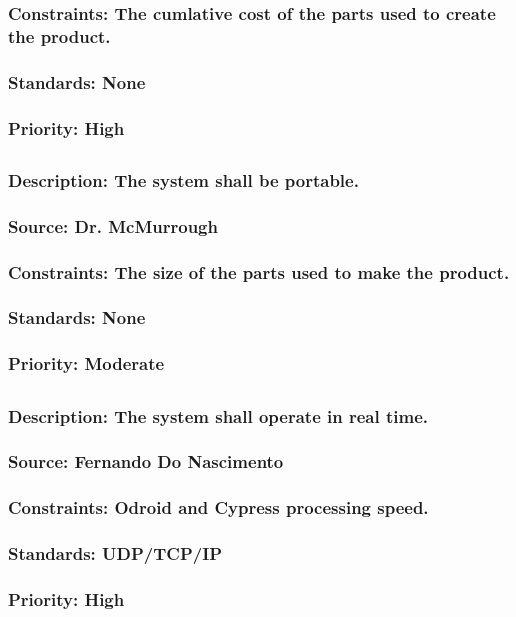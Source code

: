\subsubsection{Constraints: The cumlative cost of the parts used to create the product.}
\subsubsection{Standards: None}
\subsubsection{Priority: High}

\subsection{\bfPortability}
\subsubsection{Description: The system shall be portable.}
\subsubsection{Source: Dr. McMurrough}
\subsubsection{Constraints: The size of the parts used to make the product.}
\subsubsection{Standards: None}
\subsubsection{Priority: Moderate}

\subsection{\bfPerception}
\subsubsection{Description: The system shall operate in real time.}
\subsubsection{Source: Fernando Do Nascimento}
\subsubsection{Constraints: Odroid and Cypress processing speed.}
\subsubsection{Standards: UDP/TCP/IP}
\subsubsection{Priority: High}
